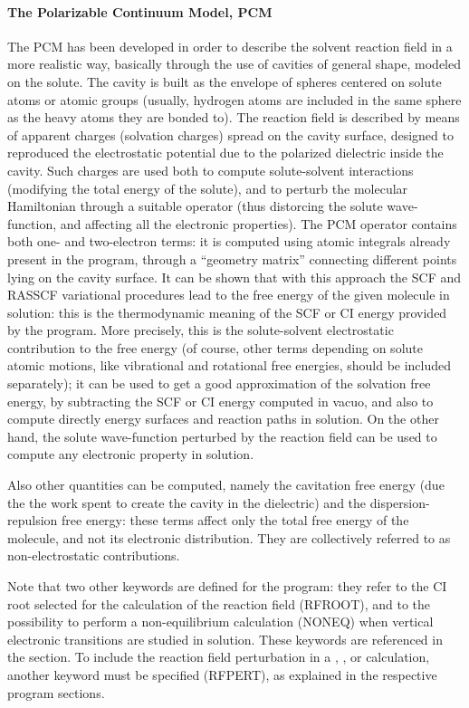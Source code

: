 \paragraph{The Polarizable Continuum Model, PCM}
The PCM has been developed in order to describe the solvent reaction field in a
more realistic way, basically through the use of cavities of general shape, modeled on the
solute. The cavity is built as the envelope of spheres centered on solute atoms or atomic
groups (usually, hydrogen atoms are included in the same sphere as the heavy atoms they are
bonded to). The reaction field is described by means of apparent charges (solvation
charges) spread on the cavity surface, designed to reproduced the electrostatic potential
due to the polarized dielectric inside the cavity.
Such charges are used both to compute solute-solvent interactions (modifying the total energy
of the solute), and to perturb the molecular Hamiltonian through a suitable operator
(thus distorcing the solute wave-function, and affecting all the electronic properties).
The PCM operator contains both one- and two-electron terms: it is computed using
atomic integrals already present in the program, through a ``geometry matrix''
connecting different points lying on the cavity surface. It can be shown that
with this approach the SCF and RASSCF variational procedures lead to the
free energy of the given molecule in solution: this is the thermodynamic meaning
of the SCF or CI energy provided by the program. More precisely, this is the
solute-solvent electrostatic contribution to the free energy
(of course, other terms depending on solute atomic motions, like vibrational and
rotational free energies, should be included separately);
it can be used to get a good
approximation of the solvation free energy, by subtracting the SCF or CI energy
computed in vacuo, and also to compute directly energy surfaces and reaction paths
in solution. On the other hand, the solute wave-function perturbed by the
reaction field can be used to compute any electronic property in solution.

Also other quantities can be computed, namely the cavitation free energy (due
the the work spent to create the cavity in the dielectric) and the
dispersion-repulsion free energy: these terms affect only the total free energy of the molecule,
and not its electronic distribution. They are collectively referred to as
non-electrostatic contributions.

Note that two other keywords are defined for the 
program:
they refer to the CI root selected for the calculation of the reaction field (RFROOT), and
to the possibility to perform a non-equilibrium calculation (NONEQ) when vertical electronic
transitions are studied in solution. These keywords are referenced in the
 section. To include the reaction field perturbation in a , ,  or 
calculation, another keyword must be specified (RFPERT), as explained in the
respective program sections.

